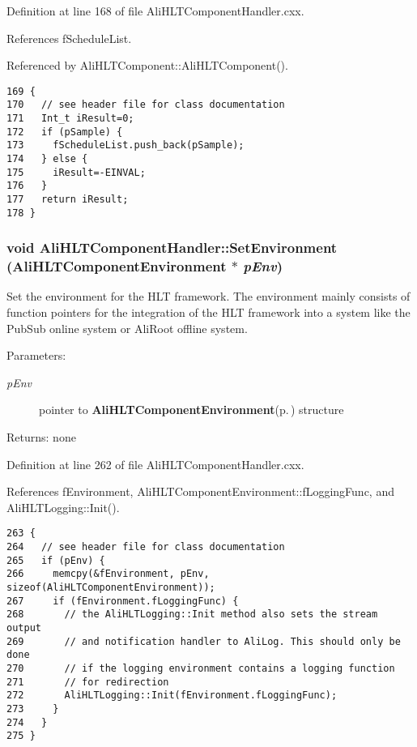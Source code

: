 Definition at line 168 of file Ali\-HLTComponent\-Handler.cxx.

References f\-Schedule\-List.

Referenced by Ali\-HLTComponent::Ali\-HLTComponent().

\footnotesize\begin{verbatim}169 {
170   // see header file for class documentation
171   Int_t iResult=0;
172   if (pSample) {
173     fScheduleList.push_back(pSample);
174   } else {
175     iResult=-EINVAL;
176   }
177   return iResult;
178 }
\end{verbatim}\normalsize 


\subsubsection{\setlength{\rightskip}{0pt plus 5cm}void Ali\-HLTComponent\-Handler::Set\-Environment ({\bf Ali\-HLTComponent\-Environment} $\ast$ {\em p\-Env})}\label{classAliHLTComponentHandler_a5}


Set the environment for the HLT framework. The environment mainly consists of function pointers for the integration of the HLT framework into a system like the Pub\-Sub online system or Ali\-Root offline system. \begin{Desc}
\item[Parameters:]
\begin{description}
\item[{\em p\-Env}]pointer to {\bf Ali\-HLTComponent\-Environment}{\rm (p.\,\pageref{structAliHLTComponentEnvironment})} structure \end{description}
\end{Desc}
\begin{Desc}
\item[Returns:]none \end{Desc}


Definition at line 262 of file Ali\-HLTComponent\-Handler.cxx.

References f\-Environment, Ali\-HLTComponent\-Environment::f\-Logging\-Func, and Ali\-HLTLogging::Init().

\footnotesize\begin{verbatim}263 {
264   // see header file for class documentation
265   if (pEnv) {
266     memcpy(&fEnvironment, pEnv, sizeof(AliHLTComponentEnvironment));
267     if (fEnvironment.fLoggingFunc) {
268       // the AliHLTLogging::Init method also sets the stream output
269       // and notification handler to AliLog. This should only be done
270       // if the logging environment contains a logging function
271       // for redirection
272       AliHLTLogging::Init(fEnvironment.fLoggingFunc);
273     }
274   }
275 }
\end{verbatim}\normalsize 


